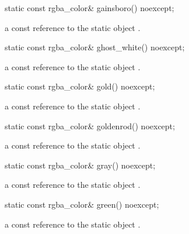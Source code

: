 \begin{itemdecl}
static const rgba_color& gainsboro() noexcept;
\end{itemdecl}
\begin{itemdescr}
\pnum
\returns
a const reference to the static  object .
\end{itemdescr}

\begin{itemdecl}
static const rgba_color& ghost_white() noexcept;
\end{itemdecl}
\begin{itemdescr}
\pnum
\returns
a const reference to the static  object .
\end{itemdescr}

\begin{itemdecl}
static const rgba_color& gold() noexcept;
\end{itemdecl}
\begin{itemdescr}
\pnum
\returns
a const reference to the static  object .
\end{itemdescr}

\begin{itemdecl}
static const rgba_color& goldenrod() noexcept;
\end{itemdecl}
\begin{itemdescr}
\pnum
\returns
a const reference to the static  object .
\end{itemdescr}

\begin{itemdecl}
static const rgba_color& gray() noexcept;
\end{itemdecl}
\begin{itemdescr}
\pnum
\returns
a const reference to the static  object .
\end{itemdescr}

\begin{itemdecl}
static const rgba_color& green() noexcept;
\end{itemdecl}
\begin{itemdescr}
\pnum
\returns
a const reference to the static  object .
\end{itemdescr}

